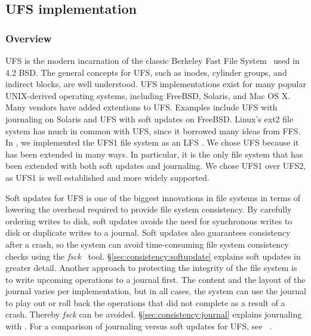 \subsection{UFS implementation}
\label{sec:modules:ufs}

\subsubsection {Overview}
UFS is the modern incarnation of the classic Berkeley Fast File
System~\cite{mckusick84fast} used in 4.2 BSD. The general concepts for UFS, such
as inodes, cylinder groups, and indirect blocks, are well understood. UFS
implementations exist for many popular UNIX-derived operating systems, including
FreeBSD, Solaris, and Mac OS X. Many vendors have added extentions to UFS.
Examples include UFS with journaling on Solaris and UFS with soft updates on
FreeBSD. Linux's ext2 file system has much in common with UFS, since it borrowed
many ideas from FFS. In \Kudos, we implemented the UFS1 file system as an LFS
\module. We chose UFS because it has been extended in many ways. In particular,
it is the only file system that has been extended with both soft updates and
journaling. We chose UFS1 over UFS2, as UFS1 is well established and more widely
supported.

Soft updates for UFS is one of the biggest innovations in file systems in terms
of lowering the overhead required to provide file system consistency. By
carefully ordering writes to disk, soft updates avoids the need for synchronous
writes to disk or duplicate writes to a journal. Soft updates also guarantees
consistency after a crash, so the system can avoid time-consuming file system
consistency checks using the \emph{fsck}~\cite{mckusick94fsck} tool.
\S\ref{sec:consistency:softupdate} explains soft updates in greater detail.
Another approach to protecting the integrity of the file system is to write
upcoming operations to a journal first. The content and the layout of the
journal varies per implementation, but in all cases, the system can use the
journal to play out or roll back the operations that did not complete as a
result of a crash. Thereby \emph{fsck} can be avoided.
\S\ref{sec:consistency:journal} explains journaling with \chdescs. For a
comparison of journaling versus soft updates for UFS, see
~\cite{seltzer00journaling}.

